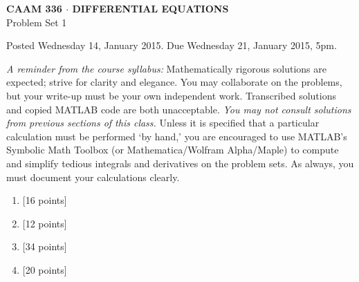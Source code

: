 \documentclass[10pt]{article}
\begin{document}
\begin{center}
\large \textsf{\textbf{CAAM 336 $\cdot$ DIFFERENTIAL EQUATIONS}\\[0.5em]
Problem Set 1 }
\end{center}

Posted Wednesday 14, January 2015.  Due Wednesday 21, January 2015, 5pm.


{\small \emph{A reminder from the course syllabus:}  
Mathematically rigorous solutions are expected; strive for clarity and elegance.
You may collaborate on the problems, but your write-up must be your own independent work.
Transcribed solutions and copied MATLAB code are both unacceptable.
\emph{You may not consult solutions from previous sections of this class.}
 Unless it is specified that a particular calculation must be performed `by hand,' you are
encouraged to use MATLAB's Symbolic Math Toolbox (or Mathematica/Wolfram Alpha/Maple)
to compute and simplify tedious integrals and derivatives on the problem sets.
As always, you must document your calculations clearly.}

\begin{enumerate}
\vspace{1cm}
\item {[16 points]}\\  
\vspace{1cm}
\item {[12 points]}\\  

\newpage
\vspace{1cm}
\item {[34 points]}\\  
\vspace{2cm}
\item {[20 points]}\\  



\end{enumerate}
\end{document}
